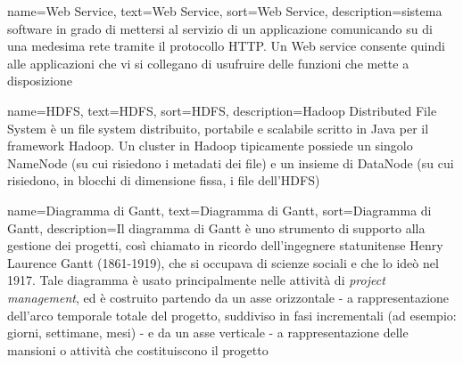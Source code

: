 {
	name=Web Service,
	text=Web Service,
	sort=Web Service,
	description={sistema software in grado di mettersi al servizio di un applicazione comunicando su di una medesima rete tramite il protocollo HTTP. Un Web service consente quindi alle applicazioni che vi si collegano di usufruire delle funzioni che mette a disposizione}
}

{
	name=HDFS,
	text=HDFS,
	sort=HDFS,
	description={Hadoop Distributed File System è un file system distribuito, portabile e scalabile scritto in Java per il framework Hadoop. Un cluster in Hadoop tipicamente possiede un singolo NameNode (su cui risiedono i metadati dei file) e un insieme di DataNode (su cui risiedono, in blocchi di dimensione fissa, i file dell'HDFS)}
}

{
	name=Diagramma di Gantt,
	text=Diagramma di Gantt,
	sort=Diagramma di Gantt,
	description={Il diagramma di Gantt è uno strumento di supporto alla gestione dei progetti, così chiamato in ricordo dell'ingegnere statunitense Henry Laurence Gantt (1861-1919), che si occupava di scienze sociali e che lo ideò nel 1917. Tale diagramma è usato principalmente nelle attività di \textit{project management}, ed è costruito partendo da un asse orizzontale - a rappresentazione dell'arco temporale totale del progetto, suddiviso in fasi incrementali (ad esempio: giorni, settimane, mesi) - e da un asse verticale - a rappresentazione delle mansioni o attività che costituiscono il progetto}
}